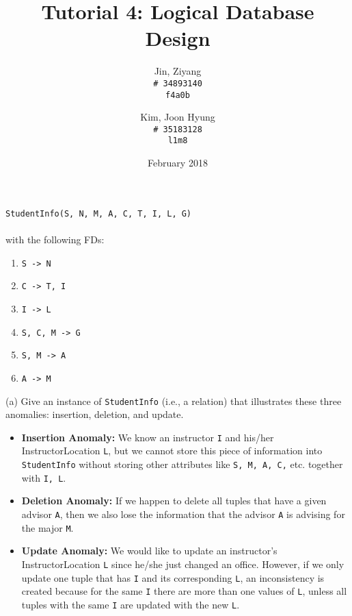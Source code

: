 \documentclass{article}
\title{Tutorial 4: Logical Database Design}
\author{
	Jin, Ziyang\\
	\texttt{\# 34893140}\\
	\texttt{f4a0b}
	\and
	Kim, Joon Hyung\\
	\texttt{\# 35183128}\\
	\texttt{l1m8}
}
\date{February 2018}
\begin{document}
	\maketitle
	\texttt{StudentInfo(S, N, M, A, C, T, I, L, G)}\\
	\\
	with the following FDs:
	\begin{enumerate}
		\item \texttt{S -> N}
		\item \texttt{C -> T, I}
		\item \texttt{I -> L}
		\item \texttt{S, C, M -> G}
		\item \texttt{S, M -> A}
		\item \texttt{A -> M}
	\end{enumerate}
	
\noindent (a) Give an instance of \texttt{StudentInfo} (i.e., a relation) that illustrates these three anomalies: insertion, deletion, and update.\\
\begin{itemize}
	\item \textbf{Insertion Anomaly:} We know an instructor \texttt{I} and his/her InstructorLocation \texttt{L}, but we cannot store this piece of information into \texttt{StudentInfo} without storing other attributes like \texttt{S, M, A, C,} etc. together with \texttt{I, L}.
	
	\item \textbf{Deletion Anomaly:} If we happen to delete all tuples that have a given advisor \texttt{A}, then we also lose the information that the advisor \texttt{A} is advising for the major \texttt{M}.
	
	\item \textbf{Update Anomaly:} We would like to update an instructor's InstructorLocation \texttt{L} since he/she just changed an office. However, if we only update one tuple that has \texttt{I} and its corresponding \texttt{L}, an inconsistency is created because for the same \texttt{I} there are more than one values of \texttt{L}, unless all tuples with the same \texttt{I} are updated with the new \texttt{L}.
\end{itemize}
\end{document}
